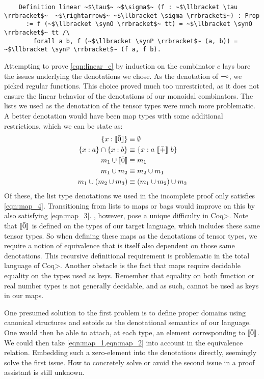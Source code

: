   \begin{verbatim}
    Definition linear ~$\tau$~ ~$\sigma$~ (f : ~$\llbracket \tau \rrbracket$~  ~$\rightarrow$~ ~$\llbracket \sigma \rrbracket$~) : Prop
      := f (~$\llbracket \synO \rrbracket$~ tt) = ~$\llbracket \synO \rrbracket$~ tt /\
        forall a b, f (~$\llbracket \synP \rrbracket$~ (a, b)) = ~$\llbracket \synP \rrbracket$~ (f a, f b).
  \end{verbatim}

  Attempting to prove \cref{eqn:linear_c} by induction on the combinator $c$ lays bare the issues underlying the denotations we chose.
  As the denotation of $\multimap$, we picked regular functions.
  This choice proved much too unrestricted, as it does not ensure the linear behavior of the denotations of our monoidal combinators.
  The lists we used as the denotation of the tensor types were much more problematic.
  A better denotation would have been map types with some additional restrictions, which we can be state as:
  \begin{align}
    \{ x : \llbracket \bar{0} \rrbracket \} &\equiv \emptyset \label{eqn:map_1}\\
    \{ x : a \} \cap \{ x : b \} &\equiv \{ x : a\ \llbracket \bar{+} \rrbracket\ b \} \label{eqn:map_5}\\
    m_1 \cup \llbracket \bar{0} \rrbracket &\equiv m_1 \label{eqn:map_2}\\
    m_1 \cup m_2 &\equiv m_2 \cup m_1 \label{eqn:map_3}\\
    m_1 \cup (m_2 \cup m_3) &\equiv (m_1 \cup m_2) \cup m_3 \label{eqn:map_4}
  \end{align}
  Of these, the list type denotations we used in the incomplete proof only satisfies \cref{eqn:map_4}.
  Transitioning from lists to maps or bags would improve on this by also satisfying \cref{eqn:map_3}.
  \Cref{eqn:map_1,eqn:map_2}, however, pose a unique difficulty in \<Coq>.
  Note that $\llbracket \bar{0} \rrbracket$ is defined on the types of our target language, which includes these same tensor types.
  So when defining these maps as the denotations of tensor types, we require a notion of equivalence that is itself also dependent on those same denotations.
  This recursive definitional requirement is problematic in the total language of \<Coq>.
  Another obstacle is the fact that maps require decidable equality on the types used as keys.
  Remember that equality on both function or real number types is not generally decidable, and as such, cannot be used as keys in our maps.

  One presumed solution to the first problem is to define proper domains using canonical structures and setoids as the denotational semantics of our language.
  One would then be able to attach, at each type, an element corresponding to $\llbracket \bar{0} \rrbracket$.
  We could then take \cref{eqn:map_1,eqn:map_2} into account in the equivalence relation.
  Embedding such a zero-element into the denotations directly, seemingly solve the first issue.
  How to concretely solve or avoid the second issue in a proof assistant is still unknown.
